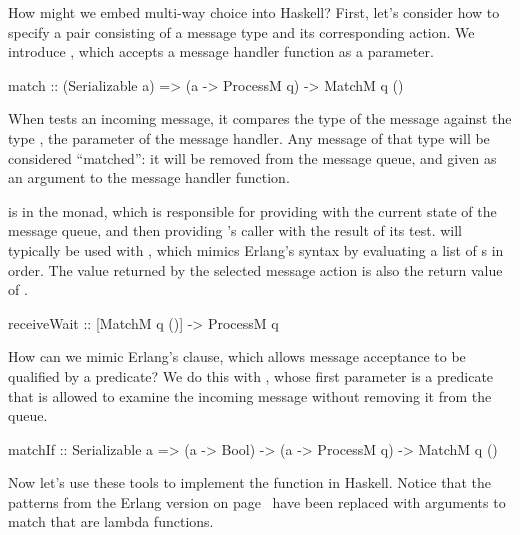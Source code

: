\documentclass[preprint]{sigplanconf}
\begin{document}
How might we embed multi-way choice into Haskell?
First, let's consider how to specify a pair consisting of a message type and its corresponding action. We introduce , which accepts a message handler function as a parameter.

\begin{code}
match :: (Serializable a) => (a -> ProcessM q) -> MatchM q ()
\end{code}
\noindent
When  tests an incoming message, it compares the type of the message against the type , the parameter of the message handler. 
Any message of that type will be considered ``matched'': 
it will be removed from the message queue, and given as an argument to the message handler function.

 is in the  monad, which is responsible for providing  with the current state of the message queue, and then providing 's caller with the result of its test.  will typically be used with , which mimics Erlang's  syntax by evaluating a list of s in order. The value returned by the selected message action is also the return value of .

\begin{code}
receiveWait :: [MatchM q ()] -> ProcessM q
\end{code}

How can we mimic Erlang's  clause, which allows message acceptance to be qualified by a predicate? 
We do this with , whose first parameter is a predicate that is allowed to examine the incoming message without removing it from the queue.

\begin{code}
matchIf :: Serializable a => (a -> Bool) -> 
								(a -> ProcessM q) -> MatchM q ()
\end{code}

Now let's use these tools to implement the  function in Haskell. 
Notice that the patterns from the Erlang version on page~\pageref{erl_math} have been replaced with arguments to match that are lambda functions.

\needspace{14ex}
\end{document}
